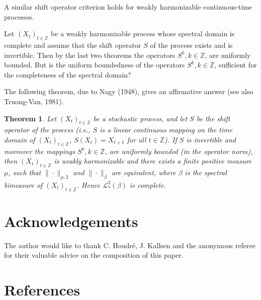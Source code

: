 \documentclass{article}
\newcommand{\cdummy}{\cdot}
\newtheorem{theorem}{Theorem}
\begin{document}
A similar shift operator criterion holds for weakly harmonizable
continuous-time processes.

Let $(X_t)_{t \in \mathbb{Z}}$ be a weakly harmonizable process whose spectral
domain is complete and assume that the shift operator $S$ of the process
exists and is invertible. Then by the last two theorems the operators $S^k, k
\in \mathbb{Z}$, are uniformly bounded. But is the uniform boundedness of the
operators $S^k, k \in \mathbb{Z}$, sufficient for the completeness of the
spectral domain?

The following theorem, due to Nagy (1948), gives an affirmative answer (see
also Truong-Van, 1981).

\begin{theorem}
  Let $(X_t)_{t \in \mathbb{Z}}$ be a stochastic process, and let $S$ be the
  shift operator of the process (i.e., $S$ is a linear continuous mapping on
  the time domain of $(X_t)_{t \in \mathbb{Z}}$, $S (X_t) = X_{t + 1}$ for all
  $t \in \mathbb{Z}$). If $S$ is invertible and moreover the mappings $S^k, k
  \in \mathbb{Z}$, are uniformly bounded (in the operator norm), then
  $(X_t)_{t \in \mathbb{Z}}$ is weakly harmonizable and there exists a finite
  positive measure $\mu$, such that $\| \cdummy \|_{\mu, 2}$ and $\| \cdummy
  \|_{\beta}$ are equivalent, where $\beta$ is the spectral bimeasure of
  $(X_t)_{t \in \mathbb{Z}}$. Hence $\mathscr{L}_{\ast}^2 (\beta)$ is
  complete.
\end{theorem}

\section*{Acknowledgements}

The author would like to thank C. Houdr{\'e}, J. Kallsen and the anonymous
referee for their valuable advice on the composition of this paper.

\section*{References}
\end{document}
